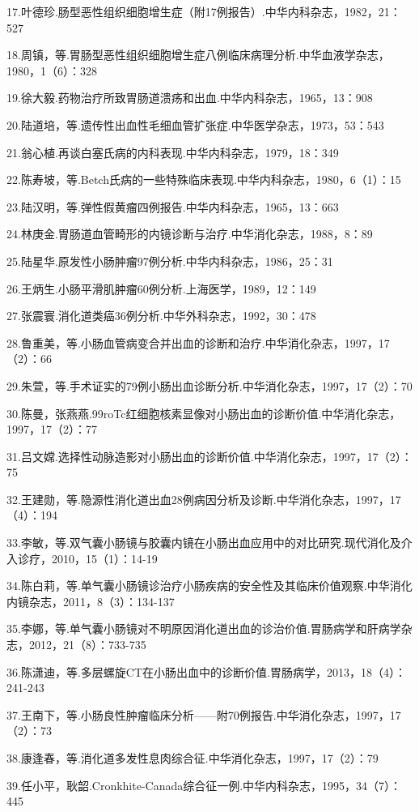 17.叶德珍.肠型恶性组织细胞增生症（附17例报告）.中华内科杂志，1982，21：527

18.周镇，等.胃肠型恶性组织细胞增生症八例临床病理分析.中华血液学杂志，1980，1（6）：328

19.徐大毅.药物治疗所致胃肠道溃疡和出血.中华内科杂志，1965，13：908

20.陆道培，等.遗传性出血性毛细血管扩张症.中华医学杂志，1973，53：543

21.翁心植.再谈白塞氏病的内科表现.中华内科杂志，1979，18：349

22.陈寿坡，等.Betch氏病的一些特殊临床表现.中华内科杂志，1980，6（1）：15

23.陆汉明，等.弹性假黄瘤四例报告.中华内科杂志，1965，13：663

24.林庚金.胃肠道血管畸形的内镜诊断与治疗.中华消化杂志，1988，8：89

25.陆星华.原发性小肠肿瘤97例分析.中华内科杂志，1986，25：31

26.王炳生.小肠平滑肌肿瘤60例分析.上海医学，1989，12：149

27.张震寰.消化道类癌36例分析.中华外科杂志，1992，30：478

28.鲁重美，等.小肠血管病变合并出血的诊断和治疗.中华消化杂志，1997，17（2）：66

29.朱萱，等.手术证实的79例小肠出血诊断分析.中华消化杂志，1997，17（2）：70

30.陈曼，张燕燕.99roTc红细胞核素显像对小肠出血的诊断价值.中华消化杂志，1997，17（2）：77

31.吕文嫦.选择性动脉造影对小肠出血的诊断价值.中华消化杂志，1997，17（2）：75

32.王建勋，等.隐源性消化道出血28例病因分析及诊断.中华消化杂志，1997，17（4）：194

33.李敏，等.双气囊小肠镜与胶囊内镜在小肠出血应用中的对比研究.现代消化及介入诊疗，2010，15（1）：14-19

34.陈白莉，等.单气囊小肠镜诊治疗小肠疾病的安全性及其临床价值观察.中华消化内镜杂志，2011，8（3）：134-137

35.李娜，等.单气囊小肠镜对不明原因消化道出血的诊治价值.胃肠病学和肝病学杂志，2012，21（8）：733-735

36.陈潇迪，等.多层螺旋CT在小肠出血中的诊断价值.胃肠病学，2013，18（4）：241-243

37.王南下，等.小肠良性肿瘤临床分析------附70例报告.中华消化杂志，1997，17（2）：73

38.康逢春，等.消化道多发性息肉综合征.中华消化杂志，1997，17（2）：79

39.任小平，耿韶.Cronkhite-Canada综合征一例.中华内科杂志，1995，34（7）：445

